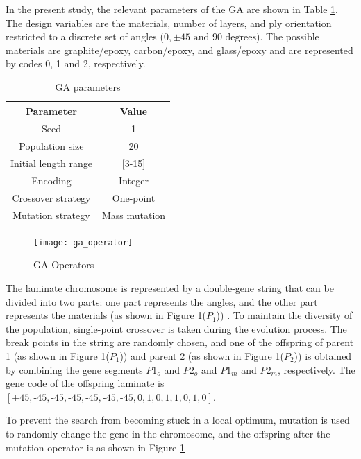\documentclass[Afour,sagev,times]{sagej}
\begin{document}
In the present study, the relevant parameters of the GA are shown in Table \ref{tab:ga}. The design
variables are the materials, number of layers, and ply orientation restricted to a discrete set of
angles ($0,\pm 45 \text{ and } 90 \text{ degrees} $). The possible materials are graphite/epoxy,
carbon/epoxy, and glass/epoxy and are represented by codes 0, 1 and 2, respectively.


\begin{table}[!ht]
\centering
\caption{GA parameters}
\begin{adjustbox}{width=0.45\textwidth}
\label{tab:ga}
\begin{tabular}{cc}
\toprule
Parameter				&  Value  \\
\midrule
Seed					& 1       \\
Population size			& 20      \\
Initial length range	& [3-15]  \\
Encoding				& Integer  \\
Crossover strategy		& One-point \\
Mutation strategy		& Mass mutation \\
\bottomrule
\end{tabular}
\end{adjustbox}
\end{table}

\begin{figure}[!htb]
  \texttt{[image: ga\_operator]}
\caption{GA Operators\label{GA:operator}}
\end{figure}

The laminate chromosome is represented by a double-gene string that can be divided into two parts:
one part represents the angles, and the other part represents the materials (as shown in Figure
\ref{GA:operator}($P_1$)) . To maintain the diversity of the population, single-point crossover is
taken during the evolution process. The break points in the string are randomly chosen, and one of
the offspring of parent 1 (as shown in Figure \ref{GA:operator}($P_1$)) and parent 2 (as shown in
Figure \ref{GA:operator}($P_2$)) is obtained by combining the gene segments $P1_o$ and $P2_o$ and
$P1_m$ and $P2_m$, respectively. The gene code of the offspring laminate is
$[\text{+}45,\text{-}45,\text{-}45,\text{-}45,\text{-}45,\text{-}45,\text{-}45,0,1,0,1,1,0,1,0]$.


To prevent the search from becoming stuck in a local optimum, mutation is used to randomly change the
gene in the chromosome, and the offspring after the mutation operator is as shown in Figure
\ref{GA:operator}
\end{document}

